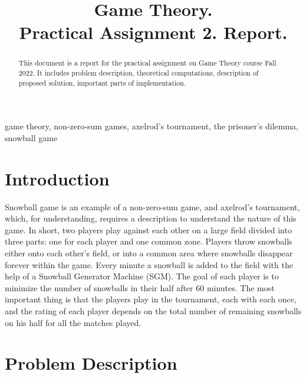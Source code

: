 \documentclass[conference]{IEEEtran}
\begin{document}
\title{Game Theory. \\ Practical Assignment 2. Report.}

\author{
}

\maketitle

\begin{abstract}
This document is a report for the practical assignment on Game Theory course Fall 2022. It includes problem description, theoretical computations, description of proposed solution, important parts of implementation.
\end{abstract}

\begin{IEEEkeywords}
game theory, non-zero-sum games, axelrod's tournament, the prisoner's dilemma, snowball game
\end{IEEEkeywords}

\section{Introduction}
Snowball game is an example of a non-zero-sum game, and axelrod's tournament, which, for understanding, requires a description to understand the nature of this game. In short, two players play against each other on a large field divided into three parts: one for each player and one common zone. Players throw snowballs either onto each other's field, or into a common area where snowballs disappear forever within the game. Every minute a snowball is added to the field with the help of a Snowball Generator Machine (SGM). The goal of each player is to minimize the number of snowballs in their half after 60 minutes. The most important thing is that the players play in the tournament, each with each once, and the rating of each player depends on the total number of remaining snowballs on his half for all the matches played.

\section{Problem Description}
\end{document}

